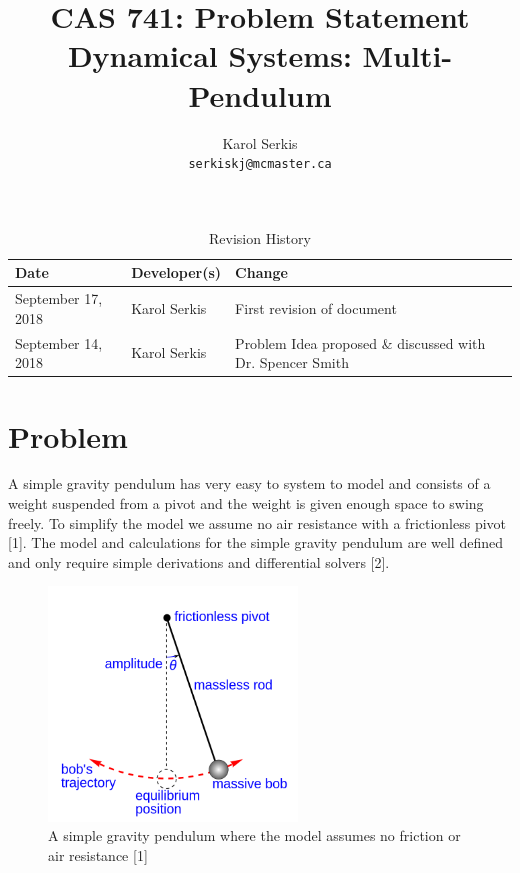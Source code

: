 \documentclass{article}
\title{CAS 741: Problem Statement\\[10pt]\Large Dynamical Systems: Multi-Pendulum }
\author{Karol Serkis\\\texttt{serkiskj@mcmaster.ca}}
\date{}
\begin{document}

\maketitle

\begin{table}[hp]
\caption{Revision History} \label{TblRevisionHistory}
\begin{tabularx}{\textwidth}{llX}
\toprule
\textbf{Date} & \textbf{Developer(s)} & \textbf{Change}\\
\midrule
September 17, 2018 & Karol Serkis & First revision of document\\
September 14, 2018 & Karol Serkis & Problem Idea proposed \& discussed with Dr. Spencer Smith \\
\bottomrule
\end{tabularx}
\end{table}


\section*{Problem}


A simple gravity pendulum has very easy to system to model and consists of a
weight suspended from a pivot and the weight is given enough space to swing
freely. To simplify the model we assume no air resistance with a frictionless
pivot [1]. The model and calculations for the simple gravity pendulum are well
defined and only require simple derivations and differential solvers
[2]. 
\begin{figure}[H]
	\centering
	\includegraphics[width=250px]{simple-pend.png}
	\caption{A simple gravity pendulum where the model assumes no friction or air resistance [1]}
	\label{fig:maxresdefault}
\end{figure}
\end{document}
